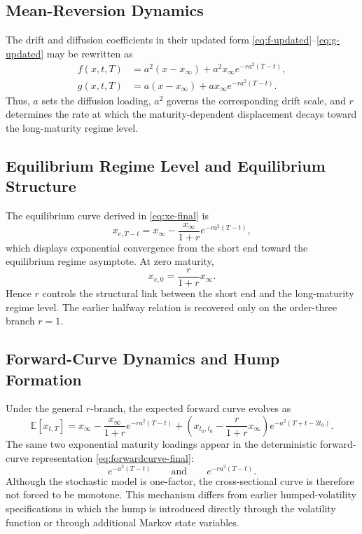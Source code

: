 \documentclass[12pt]{article}
\theoremstyle{statementstyle}
\begin{document}
\subsection{Mean-Reversion Dynamics}
\label{subsec:mean-reversion}

The drift and diffusion coefficients in their updated form
\eqref{eq:f-updated}--\eqref{eq:g-updated} may be rewritten as
\begin{align}
f(x,t,T)
&=
a^{2}(x-x_{\infty})
+
a^{2}x_{\infty}e^{-ra^{2}(T-t)},
\tag{6.1.1}\label{eq:drift-interpretation}
\\[0.4em]
g(x,t,T)
&=
a(x-x_{\infty})
+
a x_{\infty}e^{-ra^{2}(T-t)}.
\tag{6.1.2}\label{eq:stochastic-interpretation}
\end{align}
Thus, \(a\) sets the diffusion loading, \(a^{2}\) governs the
corresponding drift scale, and \(r\) determines the rate at which the
maturity-dependent displacement decays toward the long-maturity regime
level.

\subsection{Equilibrium Regime Level and Equilibrium Structure}
\label{subsec:equilibrium-structure}

The equilibrium curve derived in \eqref{eq:xe-final} is
\begin{equation}
x_{e,T-t}
=
x_{\infty}
-
\frac{x_{\infty}}{1+r}e^{-ra^{2}(T-t)},
\tag{6.2.1}\label{eq:xe-equilibrium-interpretation}
\end{equation}
which displays exponential convergence from the short end toward the
equilibrium regime asymptote. At zero maturity,
\[
x_{e,0}=\frac{r}{1+r}x_{\infty}.
\]
Hence \(r\) controls the structural link between the short end and the
long-maturity regime level. The earlier halfway relation is recovered
only on the order-three branch \(r=1\).

\subsection{Forward-Curve Dynamics and Hump Formation}
\label{subsec:forward-curve-dynamics}


Under the general \(r\)-branch, the expected forward curve evolves as
\begin{equation}
\mathbb{E}[x_{t,T}]
=
x_{\infty}
-
\frac{x_{\infty}}{1+r}e^{-ra^{2}(T-t)}
+
\left(
x_{t_{0},t_{0}}
-
\frac{r}{1+r}x_{\infty}
\right)e^{-a^{2}(T+t-2t_{0})}.
\tag{6.3.1}\label{eq:forward-curve-dynamics}
\end{equation}
The same two exponential maturity loadings appear in the deterministic
forward-curve representation \eqref{eq:forwardcurve-final}:
\[
e^{-a^{2}(T-t)}
\qquad\text{and}\qquad
 e^{-ra^{2}(T-t)}.
\]
Although the stochastic model is one-factor, the cross-sectional curve
is therefore not forced to be monotone.
This mechanism differs from earlier humped-volatility specifications in which the hump is
introduced directly through the volatility function or through additional Markov state
variables.
\end{document}
